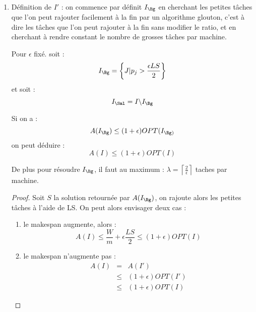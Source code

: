 \documentclass[a4paper, 11pt]{thesis}
\begin{document}
\begin{enumerate}
    \item Définition de $I'$ : on commence par définit $I_{\Bg}$ en cherchant les petites tâches
        que l'on peut rajouter facilement à la fin par un algorithme glouton, c'est à dire les
        tâches que l'on peut rajouter à la fin sans modifier le ratio, et en cherchant à rendre
        constant le nombre de grosses tâches par machine.

        \begin{lemma}
            Pour $\epsilon$ fixé. soit : \begin{displaymath}
                I_{\Bg} = \left \{ J | p_j > \frac{\epsilon LS}{2} \right \}
            \end{displaymath} et soit : \begin{displaymath}
                I_{\Sml} = I \backslash I_{\Bg}
            \end{displaymath}

            Si on a : \begin{displaymath}
                A (I_{\Bg}) \leq (1 + \epsilon) OPT(I_{\Bg)}
            \end{displaymath} on peut déduire : \begin{displaymath}
                A(I) \leq (1 + \epsilon) OPT(I)
            \end{displaymath}

            De plus pour résoudre $I_{\Bg}$, il faut au maximum : $\displaystyle \lambda = \left \lceil
            \frac{2}{\epsilon} \right \rceil$ taches par machine.
        \end{lemma}

        \begin{proof}
            Soit $S$ la solution retournée par $A(I_{\Bg})$, on rajoute alors les petites tâches à
            l'aide de LS. On peut alors envisager deux cas : \begin{enumerate}%
                \item le makespan augmente, alors : \begin{displaymath}
                        A(I) \leq \frac{W}{m} + \epsilon\frac{LS}{2} \leq (1 + \epsilon) OPT(I)
                    \end{displaymath}
                \item le makespan n'augmente pas : \begin{displaymath}
                        \begin{array}{rcl}
                            A(I) & = & A(I') \\
                                 & \leq & (1 + \epsilon) OPT(I') \\
                                 & \leq & (1 + \epsilon) OPT(I)
                        \end{array}
                    \end{displaymath}
            \end{enumerate}


\end{proof}
\end{enumerate}
\end{document}
